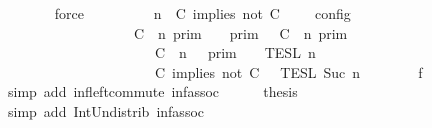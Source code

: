 \begin{isabellebody}
\ \ \ \ \ \ \isamarkupfalse%
\ force\isanewline
\ \ \ \ \isamarkupfalse%
\ \isamarkupfalse%
\ {\isacartoucheopen}{\isasymlbrakk}\ {\isasymGamma}{\isacharcomma}\ n\ {\isasymturnstile}\ {\isacharparenleft}{\isacharparenleft}C\ implies\ not\ C\ {\isacharhash}\ {\isasymPsi}{\isacharparenright}\ {\isasymtriangleright}\ {\isasymPhi}\ {\isasymrbrakk}\isactrlsub c\isactrlsub o\isactrlsub n\isactrlsub f\isactrlsub i\isactrlsub g\isanewline
\ \ \ \ \ \ \ \ \ \ \ \ \ \ \ \ \ {\isacharequal}\ {\isacharparenleft}{\isasymlbrakk}\ C\ {\isasymnot}{\isasymUp}\ n\ {\isasymrbrakk}\isactrlsub p\isactrlsub r\isactrlsub i\isactrlsub m\ {\isasyminter}\ {\isasymlbrakk}{\isasymlbrakk}\ {\isasymGamma}\ {\isasymrbrakk}{\isasymrbrakk}\isactrlsub p\isactrlsub r\isactrlsub i\isactrlsub m\ {\isasymunion}\ {\isasymlbrakk}\ C\ {\isasymUp}\ n\ {\isasymrbrakk}\isactrlsub p\isactrlsub r\isactrlsub i\isactrlsub m\isanewline
\ \ \ \ \ \ \ \ \ \ \ \ \ \ \ \ \ \ \ \ {\isasyminter}\ {\isasymlbrakk}{\isasymlbrakk}\ {\isacharparenleft}C\ {\isasymnot}{\isasymUp}\ n{\isacharparenright}\ {\isacharhash}\ {\isasymGamma}\ {\isasymrbrakk}{\isasymrbrakk}\isactrlsub p\isactrlsub r\isactrlsub i\isactrlsub m{\isacharparenright}\ {\isasyminter}\ {\isacharparenleft}{\isasymlbrakk}{\isasymlbrakk}\ {\isasymPsi}\ {\isasymrbrakk}{\isasymrbrakk}\isactrlsub T\isactrlsub E\isactrlsub S\isactrlsub L\isactrlbsup {\isasymge}\ n\isactrlesup \isanewline
\ \ \ \ \ \ \ \ \ \ \ \ \ \ \ \ \ \ \ \ {\isasyminter}\ {\isasymlbrakk}{\isasymlbrakk}\ {\isacharparenleft}C\ implies\ not\ C\ {\isacharhash}\ {\isasymPhi}\ {\isasymrbrakk}{\isasymrbrakk}\isactrlsub T\isactrlsub E\isactrlsub S\isactrlsub L\isactrlbsup {\isasymge}\ Suc\ n\isactrlesup {\isacharparenright}{\isacartoucheclose}\isanewline
\ \ \ \ \ \ \isamarkupfalse%
\ f{}\ \isamarkupfalse%
\ {\isacharparenleft}simp\ add{\isacharcolon}\ inf{\isacharunderscore}left{\isacharunderscore}commute\ inf{\isacharunderscore}assoc{\isacharparenright}\isanewline
\ \ \ \ \isamarkupfalse%
\ {\isacharquery}thesis\ \isamarkupfalse%
\ {\isacharparenleft}simp\ add{\isacharcolon}\ Int{\isacharunderscore}Un{\isacharunderscore}distrib{}\ inf{\isacharunderscore}assoc{\isacharparenright}\isanewline
\ \ \isamarkupfalse%
\isanewline

\end{isabellebody}
